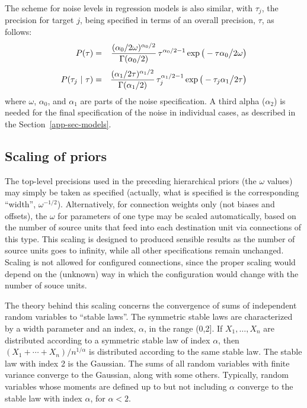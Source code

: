 \documentclass{report}[11pt]
\def\beq{\begin{eqnarray}}
\def\eeq{\end{eqnarray}}
\begin{document}
The scheme for noise levels in regression models is also similar, with
$\tau_j$, the precision for target $j$, being specified in terms of
an overall precision, $\tau$, as follows:\beq
  P(\tau)
   & = & {(\alpha_{0}/2\omega)^{\alpha_{0}/2} 
          \over \Gamma(\alpha_{0}/2)}\,
         \tau^{\alpha_{0}/2-1}
         \exp \big(-\tau \alpha_{0} \big/ 2 \omega \big) 
\label{noiseprior1}\\[3pt]
  P(\tau_{j}\ |\ \tau)
   & = & {(\alpha_{1}/2\tau)^{\alpha_{1}/2} 
          \over \Gamma(\alpha_{1}/2)}\,
         \tau_{j}^{\alpha_{1}/2-1}
         \exp \big(-\tau_{j} \alpha_{1} \big/ 2 \tau \big)
\label{noiseprior2}\eeq%
where $\omega$, $\alpha_0$, and $\alpha_1$ are parts of the noise
specification.  A third alpha ($\alpha_2$) is needed for the final
specification of the noise in individual cases, as described in the
Section~\ref{app-sec-models}.


\subsection*{Scaling of priors}

The top-level precisions used in the preceding hierarchical priors
(the $\omega$ values) may simply be taken as specified (actually, what
is specified is the corresponding ``width'', $\omega^{-1/2}$).
Alternatively, for connection weights only (not biases and offsets),
the $\omega$ for parameters of one type may be scaled automatically,
based on the number of source units that feed into each destination
unit via connections of this type.  This scaling is designed to
produced sensible results as the number of source units goes to
infinity, while all other specifications remain unchanged.  Scaling is
not allowed for configured connections, since the proper scaling would
depend on the (unknown) way in which the configuration would change
with the number of souce units.

The theory behind this scaling concerns the convergence of sums of
independent random variables to ``stable laws''.  The symmetric stable
laws are characterized by a width parameter and an index, $\alpha$, in
the range (0,2].  If $X_1,\ldots,X_n$ are distributed according to a
symmetric stable law of index $\alpha$, then
$(X_1+\cdots+X_n)/n^{1/\alpha}$ is distributed according to the same
stable law.  The stable law with index 2 is the Gaussian.  The sums of
all random variables with finite variance converge to the Gaussian,
along with some others.  Typically, random variables whose moments are
defined up to but not including $\alpha$ converge to the stable law
with index $\alpha$, for $\alpha<2$.
\end{document}

